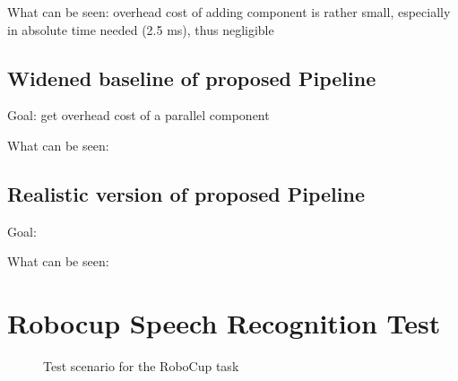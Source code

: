 What can be seen: overhead cost of adding component is rather small, especially in absolute time needed (2.5 ms), thus negligible

\subsection{Widened baseline of proposed Pipeline}

Goal: get overhead cost of a parallel component

What can be seen: 

\subsection{Realistic version of proposed Pipeline}

Goal: 

What can be seen: 



\section{Robocup Speech Recognition Test}


\begin{figure}[ht]	
	\centering
	
	\caption{Test scenario for the RoboCup task}
	\label{pic:eval_task}
\end{figure}

